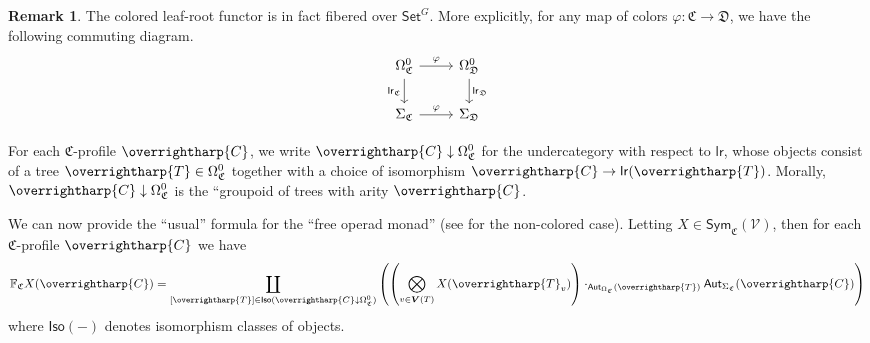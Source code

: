 \documentclass[a4paper,10pt
]{article}%
\numberwithin{equation}{section}
\numberwithin{figure}{section}
\theoremstyle{definition} %
\newtheorem{remark}[equation]{Remark}%
\newcommand{\vect}[1]{\text{\overrightharp{\ensuremath{#1}}}}
\newcommand{\V}{\ensuremath{\mathcal V}}
\newcommand{\1}{\ensuremath{\mathbbm 1}}%
\begin{document}
\begin{remark}
	The colored leaf-root functor is in fact fibered over $\mathsf{Set}^G$.
	More explicitly, for any map of colors 
	$\varphi \colon \mathfrak C \to \mathfrak D$,
	we have the following commuting diagram.
	\begin{equation}
	\label{COLORLR_EQ}
	\begin{tikzcd}
	\Omega_{\mathfrak C}^0 \arrow[r, "\varphi"] \arrow[d, "\mathsf{lr}_{\mathfrak C}"']
	&
	\Omega_{\mathfrak D}^0 \arrow[d, "\mathsf{lr}_{\mathfrak D}"]
	\\
	\Sigma_{\mathfrak C} \arrow[r, "\varphi"]
	&
	\Sigma_{\mathfrak D}
	\end{tikzcd}
	\end{equation}
\end{remark}

For each $\mathfrak{C}$-profile $\vect{C}$,
we write $\vect{C} \downarrow \Omega_{\mathfrak{C}}^0$
for the undercategory with respect to $\mathsf{lr}$, 
whose objects consist of a tree $\vect{T}\in \Omega_{\mathfrak{C}}^0$
together with a choice of isomorphism 
$\vect{C} \to \mathsf{lr}(\vect{T})$.
Morally, $\vect{C} \downarrow \Omega_{\mathfrak{C}}^0$
is the ``groupoid of trees with arity $\vect{C}$. 

We can now provide the ``usual'' formula for the ``free operad monad'' 
(see \cite[page 816]{BM07} for the non-colored case).
Letting $X \in \mathsf{Sym}_{\mathfrak{C}}(\V)$,
then for each $\mathfrak{C}$-profile $\vect{C}$ we have
\begin{equation}
        \label{FROPEXP EQ}
        \mathbb{F}_{\mathfrak{C}} X (\vect{C})
        =
        \coprod_{[\vect{T}] \in 
          \mathsf{Iso}(\vect{C} \downarrow \Omega^0_{\mathfrak{C}})}
        \left(
                \left(
                        \bigotimes_{v \in \boldsymbol{V}(T)} X(\vect{T}_v)
                \right)
                \cdot_{\mathsf{Aut}_{\Omega_{\mathfrak{C}}}(\vect{T})}
                \mathsf{Aut}_{\Sigma_{\mathfrak{C}}}(\vect{C})
        \right)
\end{equation}
where $\mathsf{Iso}(-)$ denotes isomorphism classes of objects.
\end{document}
